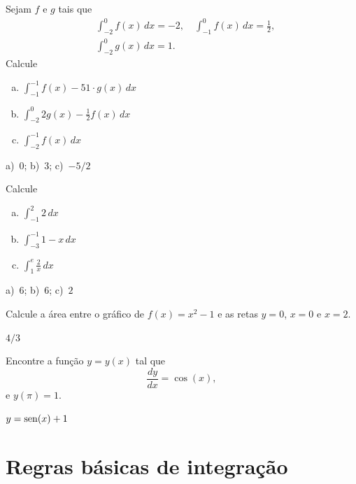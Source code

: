 \begin{exer}
  Sejam $f$ e $g$ tais que
  \begin{align}
    &\int_{-2}^{0} f(x)\,dx = -2,\quad\int_{-1}^{0} f(x)\,dx = \frac{1}{2},\\
    &\int_{-2}^0 g(x)\,dx = 1.
  \end{align}
  Calcule
  \begin{enumerate}[a)]
  \item $\displaystyle \int_{-1}^{-1} f(x) - 51\cdot g(x)\,dx$
  \item $\displaystyle \int_{-2}^{0} 2g(x) - \frac{1}{2}f(x)\,dx$
  \item $\displaystyle \int_{-2}^{-1} f(x)\,dx$
  \end{enumerate}
\end{exer}
\begin{resp}
  a)~$0$; b)~$3$; c)~$-5/2$
\end{resp}

\begin{exer}
  Calcule
  \begin{enumerate}[a)]
  \item $\displaystyle\int_{-1}^2 2\,dx$
  \item $\displaystyle\int_{-3}^{-1} 1-x\,dx$
  \item $\displaystyle\int_{1}^{e} \frac{2}{x}\,dx$
  \end{enumerate}
\end{exer}
\begin{resp}
  a)~$6$; b)~$6$; c)~$2$
\end{resp}

\begin{exer}
  Calcule a área entre o gráfico de $f(x) = x^2-1$ e as retas $y=0$, $x=0$ e $x=2$.
\end{exer}
\begin{resp}
  $4/3$
\end{resp}

\begin{exer}
  Encontre a função $y = y(x)$ tal que
  \begin{equation}
    \frac{dy}{dx} = \cos(x),
  \end{equation}
  e $y(\pi) = 1$.
\end{exer}
\begin{resp}
  $y = \operatorname{sen}(x) + 1$
\end{resp}

\section{Regras básicas de integração}\label{cap_int_sec_regrasbasic}

